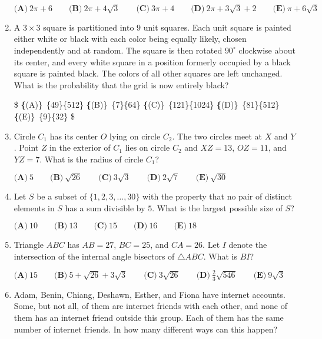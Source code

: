 \documentclass{article}
\begin{document}
\begin{enumerate}[label=\arabic*., itemsep=0.5em]
$ \textbf{(A)}\ 2\pi+6\qquad\textbf{(B)}\ 2\pi+4\sqrt3 \qquad\textbf{(C)}\ 3\pi+4 \qquad\textbf{(D)}\ 2\pi+3\sqrt3+2 \qquad\textbf{(E)}\ \pi+6\sqrt3 $\par \vspace{0.5em}\item A $3\times3$ square is partitioned into $9$ unit squares.  Each unit square is painted either white or black with each color being equally likely, chosen independently and at random.  The square is then rotated $90^\circ$ clockwise about its center, and every white square in a position formerly occupied by a black square is painted black.  The colors of all other squares are left unchanged.  What is the probability that the grid is now entirely black?

\$ \textbf\{(A)\}\ \dfrac\{49\}\{512\}
\qquad\textbf\{(B)\}\ \dfrac\{7\}\{64\}
\qquad\textbf\{(C)\}\ \dfrac\{121\}\{1024\}
\qquad\textbf\{(D)\}\ \dfrac\{81\}\{512\}
\qquad\textbf\{(E)\}\ \dfrac\{9\}\{32\}
 \$\par \vspace{0.5em}\item Circle $C_1$ has its center $O$ lying on circle $C_2$.  The two circles meet at $X$ and $Y$.  Point $Z$ in the exterior of $C_1$ lies on circle $C_2$ and $XZ=13$, $OZ=11$, and $YZ=7$.  What is the radius of circle $C_1$?

$ \textbf{(A)}\ 5\qquad\textbf{(B)}\ \sqrt{26}\qquad\textbf{(C)}\ 3\sqrt{3}\qquad\textbf{(D)}\ 2\sqrt{7}\qquad\textbf{(E)}\ \sqrt{30} $\par \vspace{0.5em}\item Let $S$ be a subset of $\{1,2,3,\dots,30\}$ with the property that no pair of distinct elements in $S$ has a sum divisible by $5$.  What is the largest possible size of $S$?

$ \textbf{(A)}\ 10\qquad\textbf{(B)}\ 13\qquad\textbf{(C)}\ 15\qquad\textbf{(D)}\ 16\qquad\textbf{(E)}\ 18 $\par \vspace{0.5em}\item Triangle $ABC$ has $AB=27$, $BC=25$, and $CA=26$.  Let $I$ denote the intersection of the internal angle bisectors of $\triangle ABC$.  What is $BI$?

$ \textbf{(A)}\ 15\qquad\textbf{(B)}\ 5+\sqrt{26}+3\sqrt{3}\qquad\textbf{(C)}\ 3\sqrt{26}\qquad\textbf{(D)}\ \frac{2}{3}\sqrt{546}\qquad\textbf{(E)}\ 9\sqrt{3} $\par \vspace{0.5em}\item Adam, Benin, Chiang, Deshawn, Esther, and Fiona have internet accounts.  Some, but not all, of them are internet friends with each other, and none of them has an internet friend outside this group.  Each of them has the same number of internet friends.  In how many different ways can this happen?


\end{enumerate}
\end{document}
